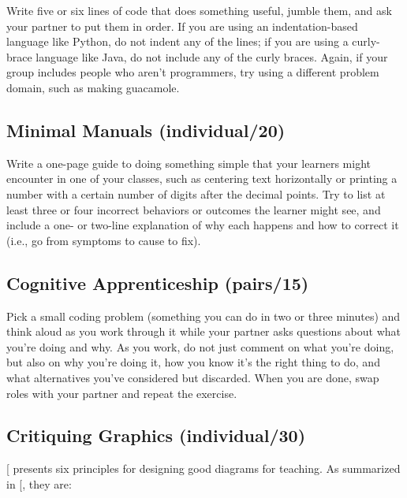 Write five or six lines of code that does something useful, jumble them,
and ask your partner to put them in order. If you are using an
indentation-based language like Python, do not indent any of the lines;
if you are using a curly-brace language like Java, do not include any of
the curly braces. Again, if your group includes people who aren't
programmers, try using a different problem domain, such as making
guacamole.

\subsection{Minimal Manuals (individual/20)}\label{minimal-manuals-individual20}

Write a one-page guide to doing something simple that your learners
might encounter in one of your classes, such as centering text
horizontally or printing a number with a certain number of digits after
the decimal points. Try to list at least three or four incorrect
behaviors or outcomes the learner might see, and include a one- or
two-line explanation of why each happens and how to correct it (i.e., go
from symptoms to cause to fix).

\subsection{Cognitive Apprenticeship (pairs/15)}\label{cognitive-apprenticeship-pairs15}

Pick a small coding problem (something you can do in two or three
minutes) and think aloud as you work through it while your partner asks
questions about what you're doing and why. As you work, do not just
comment on what you're doing, but also on why you're doing it, how you
know it's the right thing to do, and what alternatives you've considered
but discarded. When you are done, swap roles with your partner and
repeat the exercise.

\subsection{Critiquing Graphics (individual/30)}\label{critiquing-graphics-individual30}

{[}\protect[\hyperlink{b:Maye2009}{Maye2009}]{]} presents six principles for designing good diagrams
for teaching. As summarized in {[}\protect[\hyperlink{b:Mill2016a}{Mill2016a}]{]}, they are:

